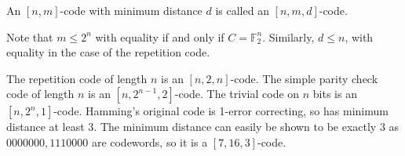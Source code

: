 \begin{definition}
    An \( [n,m] \)-code with minimum distance \( d \) is called an \( [n,m,d] \)-code.
\end{definition}
Note that \( m \leq 2^n \) with equality if and only if \( C = \mathbb F_2^n \).
Similarly, \( d \leq n \), with equality in the case of the repetition code.
\begin{example}
    The repetition code of length \( n \) is an \( [n,2,n] \)-code.
    The simple parity check code of length \( n \) is an \( [n,2^{n-1},2] \)-code.
    The trivial code on \( n \) bits is an \( [n,2^n,1] \)-code.
    Hamming's original code is 1-error correcting, so has minimum distance at least 3.
    The minimum distance can easily be shown to be exactly 3 as \( 0000000, 1110000 \) are codewords, so it is a \( [7,16,3] \)-code.
\end{example}

